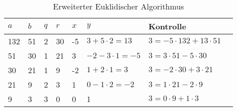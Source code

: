 \begin{table}
  \caption{Erweiterter Euklidischer Algorithmus}
  \centering
  \begin{tabular}{|l|l|l|l|l|l|l|l|}
    \hline
    $a$ & $b$ & $q$ & $r$ & $x$ & $y$                   & Kontrolle                        \\ \hline
    132 & 51  & 2   & 30  & -5  & $3 +5 \cdot 2 = 13$   & $3 = -5 \cdot 132 + 13 \cdot 51$ \\ \hline
    51  & 30  & 1   & 21  & 3   & $-2 - 3 \cdot 1 = -5$ & $3 = 3 \cdot 51 - 5 \cdot 30$    \\ \hline
    30  & 21  & 1   & 9   & -2  & $1 + 2 \cdot 1 = 3$   & $3 = -2 \cdot 30 + 3 \cdot 21$   \\ \hline
    21  & 9   & 2   & 3   & 1   & $0 - 1 \cdot 2 = -2$  & $3 = 1 \cdot 21 - 2 \cdot 9$     \\ \hline
    9   & 3   & 3   & 0   & 0   & 1                     & $3 = 0 \cdot 9 + 1 \cdot 3$      \\ \hline
  \end{tabular}
\end{table}

